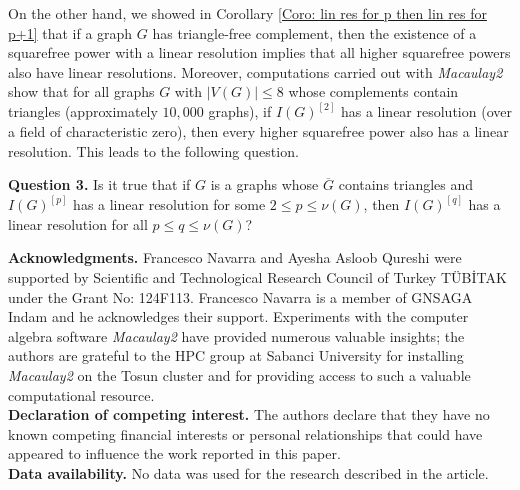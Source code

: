 \documentclass[12pt]{amsart}
\begin{document}
\medskip

On the other hand, we showed in Corollary \ref{Coro: lin res for p then lin res for p+1} that if a graph $G$ has triangle-free complement, then the existence of a squarefree power with a linear resolution implies that all higher squarefree powers also have linear resolutions. Moreover, computations carried out with \textit{Macaulay2} show that for all graphs $G$ with $|V(G)|\leq 8$ whose complements contain triangles (approximately $10{,}000$ graphs), if $I(G)^{[2]}$ has a linear resolution (over a field of characteristic zero), then every higher squarefree power also has a linear resolution. This leads to the following question.

\medskip
\textbf{Question 3.} Is it true that if $G$ is a graphs whose $\overline{G}$ contains triangles and $I(G)^{[p]}$ has a linear resolution for some $2 \leq p \leq \nu(G)$, then $I(G)^{[q]}$ has a linear resolution for all $p \leq q \leq \nu(G)$?

\medskip



\begin{footnotesize}
{\bf Acknowledgments.} Francesco Navarra and Ayesha Asloob Qureshi were supported by Scientific and Technological Research Council of Turkey T\"UB\.{I}TAK under the Grant No: 124F113. Francesco Navarra is a member of GNSAGA Indam and he acknowledges their support. Experiments with the computer algebra software \textit{Macaulay2} \cite{M2} have provided numerous valuable insights; the authors are grateful to the HPC group at Sabanci University for installing \textit{Macaulay2} on the Tosun cluster and for providing access to such a valuable computational resource. \\

{\bf Declaration of competing interest.}  The authors declare that they have no known competing financial interests or personal relationships that could have appeared to influence the work reported in this paper.\\

{\bf Data availability.} No data was used for the research described in the article.  
\end{footnotesize}

{}
	
\end{document}
